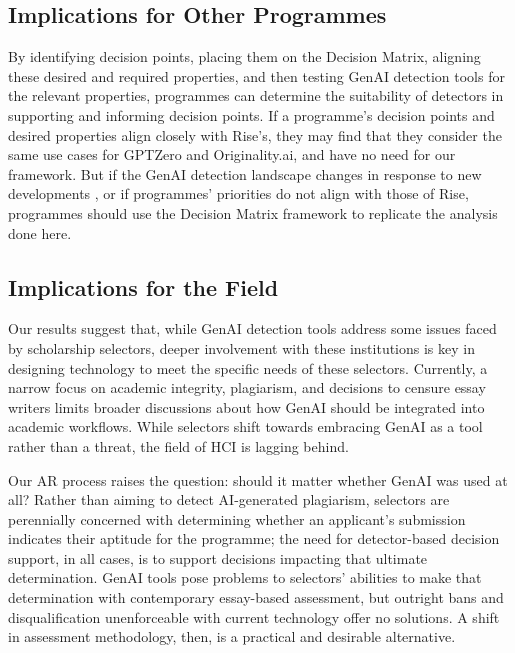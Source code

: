 \subsection{Implications for Other Programmes}
By identifying decision points, placing them on the Decision Matrix, aligning these desired and required properties, and then testing GenAI detection tools for the relevant properties, programmes can determine the suitability of detectors in supporting and informing decision points. If a programme's decision points and desired properties align closely with Rise's, they may find that they consider the same use cases for GPTZero and Originality.ai, and have no need for our framework. But if the GenAI detection landscape changes in response to new developments \cite{ashish_vaswani_attention_2017,jacob_devlin_bert_2018,openai_gpt-4_2023,liang_gpt_2023,mitchell_detectgpt_2023,liu_deid-gpt_2023,kalpesh_krishna_paraphrasing_2023}, or if programmes' priorities do not align with those of Rise, programmes should use the Decision Matrix framework to replicate the analysis done here.

\subsection{Implications for the Field}
Our results suggest that, while GenAI detection tools address some issues faced by scholarship selectors, deeper involvement with these institutions is key in designing technology to meet the specific needs of these selectors. Currently, a narrow focus on academic integrity, plagiarism, and decisions to censure essay writers limits broader discussions about how GenAI should be integrated into academic workflows. While selectors shift towards embracing GenAI as a tool rather than a threat, the field of HCI is lagging behind. 

Our AR process raises the question: should it matter whether GenAI was used at all? Rather than aiming to detect AI-generated plagiarism, selectors are perennially concerned with determining whether an applicant's submission indicates their aptitude for the programme; the need for detector-based decision support, in all cases, is to support decisions impacting that ultimate determination. GenAI tools pose problems to selectors' abilities to make that determination with contemporary essay-based assessment, but outright bans and disqualification \cite{h_holden_thorp_chatgpt_2023} unenforceable with current technology offer no solutions. A shift in assessment methodology, then, is a practical and desirable alternative.

